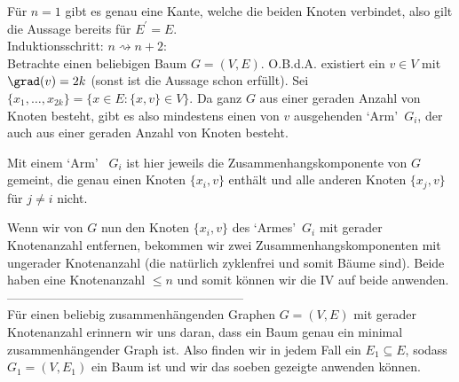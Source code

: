 \begin{solution}
Für $n = 1$ gibt es genau eine Kante, welche die beiden Knoten verbindet,
also gilt die Aussage bereits für $E^{\prime} = E$. \\

Induktionsschritt: $n \rightsquigarrow n + 2$: \\
Betrachte einen beliebigen Baum $G = (V,E)$.
O.B.d.A. existiert ein $v \in V$ mit $\grad(v) = 2k$ (sonst ist die Aussage schon erfüllt). Sei $\{x_1,\dots,x_{2k}\} = \{x \in E: \{x,v \} \in V\}$.
Da ganz $G$ aus einer geraden Anzahl von Knoten besteht, gibt es also mindestens einen von $v$ ausgehenden \textquoteleft{Arm}\textquoteright ~$G_i$, der auch aus einer geraden Anzahl von Knoten besteht.

Mit einem \textquoteleft{Arm}\textquoteright ~ $G_i$ ist hier jeweils die Zusammenhangskomponente von $G$ gemeint, die genau einen Knoten $\{x_i,v\}$ enthält und alle anderen Knoten $\{x_j,v\}$ für $j \neq i$ nicht.

Wenn wir von $G$ nun den Knoten $\{x_i,v\}$ des \textquoteleft{Armes}\textquoteright ~$G_i$ mit gerader Knotenanzahl entfernen, bekommen wir zwei Zusammenhangskomponenten mit ungerader Knotenanzahl (die natürlich zyklenfrei und somit Bäume sind). Beide haben eine Knotenanzahl $\leq n$ und somit können wir die IV auf beide anwenden. \\

---------------------------------------------------------\\


Für einen beliebig zusammenhängenden Graphen $G = (V,E)$ mit gerader Knotenanzahl
erinnern wir uns daran, dass
ein Baum genau ein minimal zusammenhängender Graph ist.
Also finden wir in jedem Fall ein $E_1 \subseteq E$, sodass $G_1 = (V,E_1)$
ein Baum ist und wir das soeben gezeigte anwenden können.

\end{solution}

